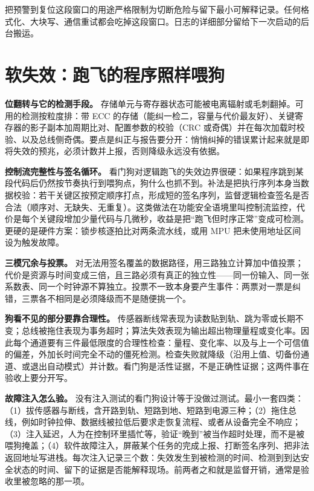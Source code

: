 \documentclass[12pt,a4paper,fontset=fandol]{ctexbook}
\begin{document}
\begin{bestpractice}[title={预警中断只做两件事：钉输出、留小证据}]
把预警到复位这段窗口的用途严格限制为切断危险与留下最小可解释记录。任何格式化、大块写、通信重试都会吃掉这段窗口。日志的详细部分留给下一次启动的后台搬运。
\end{bestpractice}

\section{软失效：跑飞的程序照样喂狗}

\textbf{位翻转与它的检测手段。} 存储单元与寄存器状态可能被电离辐射或毛刺翻掉。可用的检测按粒度排：带 ECC 的存储（能纠一检二，容量与代价最友好）、关键寄存器的影子副本加周期比对、配置参数的校验（CRC 或奇偶）并在每次加载时校验、以及总线侧奇偶。要点是纠正与报告要分开：悄悄纠掉的错误累计起来就是即将失效的预兆，必须计数并上报，否则降级永远没有依据。

\textbf{控制流完整性与签名循环。} 看门狗对逻辑跑飞的失效边界很硬：如果程序跳到某段代码后仍然按节奏执行到喂狗点，狗什么也抓不到。补法是把执行序列本身当数据校验：若干关键区按预定顺序打点，形成短的签名序列，监督逻辑检查签名是否合法（顺序对、无缺失、无重复）。这类做法在功能安全语境里叫控制流监控，代价是每个关键段增加少量代码与几微秒，收益是把``跑飞但时序正常''变成可检测。更硬的是硬件方案：锁步核逐拍比对两条流水线，或用 MPU 把未使用地址区间设为触发故障。

\textbf{三模冗余与投票。} 对无法用签名覆盖的数据路径，用三路独立计算加中值投票；代价是资源与时间变成三倍，且三路必须有真正的独立性——同一份输入、同一张系数表、同一个时钟源不算独立。投票不一致本身要产生事件：两票对一票是纠错，三票各不相同是必须降级而不是随便挑一个。

\textbf{狗看不见的部分要靠合理性。} 传感器断线常表现为读数贴到轨、跳为零或长期不变；总线被拖住表现为事务超时；算法失效表现为输出超出物理量程或变化率。因此每个通道要有三件最低限度的合理性检查：量程、变化率、以及与上一个可信值的偏差，外加长时间完全不动的僵死检测。检查失败就降级（沿用上值、切备份通道、或退出自动模式）并计数。看门狗是活性证据，不是正确性证据；这两件事在验收上要分开写。

\textbf{故障注入怎么验。} 没有注入测试的看门狗设计等于没做过测试。最小一套四类：（1）拔传感器与断线，含开路到轨、短路到地、短路到电源三种；（2）拖住总线，例如时钟拉伸、数据线被拉低后要求走恢复流程、或者从设备完全不响应；（3）注入延迟，人为在控制环里插忙等，验证``晚到''被当作超时处理，而不是被喂狗掩盖；（4）软件故障注入，屏蔽某个任务的完成上报、打断签名序列、把非法返回地址写进栈。每次注入记录三个数：失效发生到被检测的时间、检测到到达安全状态的时间、留下的证据是否能解释现场。前两者之和就是监督开销，通常是验收里被忽略的那一项。
\end{document}
